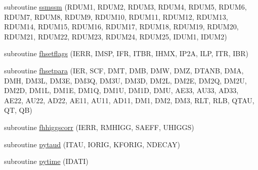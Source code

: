 \begin{DoxyCompactItemize}
subroutine \hyperlink{pythia-6_84_824_8f_a36c355d934e1add83191d4771bdc42b6}{ssmssm} (R\+D\+U\+M1, R\+D\+U\+M2, R\+D\+U\+M3, R\+D\+U\+M4, R\+D\+U\+M5, R\+D\+U\+M6, R\+D\+U\+M7, R\+D\+U\+M8, R\+D\+U\+M9, R\+D\+U\+M10, R\+D\+U\+M11, R\+D\+U\+M12, R\+D\+U\+M13, R\+D\+U\+M14, R\+D\+U\+M15, R\+D\+U\+M16, R\+D\+U\+M17, R\+D\+U\+M18, R\+D\+U\+M19, R\+D\+U\+M20, R\+D\+U\+M21, R\+D\+U\+M22, R\+D\+U\+M23, R\+D\+U\+M24, R\+D\+U\+M25, I\+D\+U\+M1, I\+D\+U\+M2)
\item 
subroutine \hyperlink{pythia-6_84_824_8f_ace9d6bb1ab3a0a99d03c5349150b6df6}{fhsetflags} (I\+E\+R\+R, I\+M\+S\+P, I\+F\+R, I\+T\+B\+R, I\+H\+M\+X, I\+P2\+A, I\+L\+P, I\+T\+R, I\+B\+R)
\item 
subroutine \hyperlink{pythia-6_84_824_8f_af13999968d4310ceacf1f109a96c18fe}{fhsetpara} (I\+E\+R, S\+C\+F, D\+M\+T, D\+M\+B, D\+M\+W, D\+M\+Z, D\+T\+A\+N\+B, D\+M\+A, D\+M\+H, D\+M3\+L, D\+M3\+E, D\+M3\+Q, D\+M3\+U, D\+M3\+D, D\+M2\+L, D\+M2\+E, D\+M2\+Q, D\+M2\+U, D\+M2\+D, D\+M1\+L, D\+M1\+E, D\+M1\+Q, D\+M1\+U, D\+M1\+D, D\+M\+U, A\+E33, A\+U33, A\+D33, A\+E22, A\+U22, A\+D22, A\+E11, A\+U11, A\+D11, D\+M1, D\+M2, D\+M3, R\+L\+T, R\+L\+B, Q\+T\+A\+U, Q\+T, Q\+B)
\item 
subroutine \hyperlink{pythia-6_84_824_8f_aaab7f08e5ab3ff24e4972c6341e3800f}{fhhiggscorr} (I\+E\+R\+R, R\+M\+H\+I\+G\+G, S\+A\+E\+F\+F, U\+H\+I\+G\+G\+S)
\item 
subroutine \hyperlink{pythia-6_84_824_8f_ac915defed887990f1ac86812b9c11c49}{pytaud} (I\+T\+A\+U, I\+O\+R\+I\+G, K\+F\+O\+R\+I\+G, N\+D\+E\+C\+A\+Y)
\item 
subroutine \hyperlink{pythia-6_84_824_8f_a523e4acf745637220400daf831c34a23}{pytime} (I\+D\+A\+T\+I)
\end{DoxyCompactItemize}


